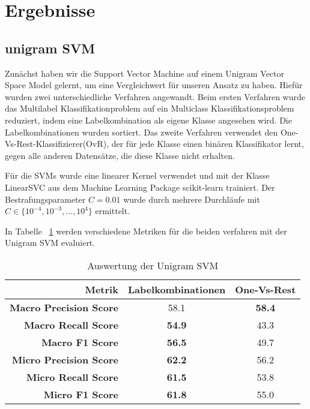 \section{Ergebnisse}
\subsection{unigram SVM}
\label{sub:unigram_svm}

Zunächst haben wir die Support Vector Machine auf einem Unigram Vector Space Model gelernt,
um eine Vergleichwert für unseren Ansatz zu haben. Hiefür wurden zwei unterschiedliche Verfahren angewandt.
Beim ersten Verfahren wurde das Multilabel Klassifikationproblem auf ein Multiclass Klassifikationsproblem reduziert,
indem eine Labelkombination als eigene Klasse angesehen wird. Die Labelkombinationen wurden sortiert.
Das zweite Verfahren verwendet den One-Vs-Rest-Klassifizierer(OvR), der für jede Klasse einen binären Klassifikator lernt,
gegen alle anderen Datensätze, die diese Klasse nicht erhalten.

Für die SVMs wurde eine linearer Kernel verwendet und mit der Klasse LinearSVC aus dem Machine Learning Package scikit-learn \cite{scikit-learn} trainiert. Der Bestrafungsparameter $C = 0.01$ wurde durch mehrere Durchläufe mit $C \in \{ 10^{-4},10^{-3}, \dots, 10^4 \}$ ermittelt.

In Tabelle ~\ref{tab:unigram_svm} werden verschiedene Metriken für die beiden verfahren mit der Unigram SVM evaluiert.

\begin{table}[h]
    \centering
    \begin{tabular}{r|cc}
        \small \textbf{Metrik} & \small\textbf{Labelkombinationen} & \small\textbf{One-Vs-Rest}\\
        \hline
        \small \textbf{Macro Precision Score}  & \small 58.1 & \small  \textbf{58.4}\\
        \small \textbf{Macro Recall Score}     & \small \textbf{54.9} & \small 43.3\\
        \small \textbf{Macro F1 Score}        & \small \textbf{56.5} & \small 49.7\\
        \small \textbf{Micro Precision Score} & \small \textbf{62.2} & \small 56.2\\
        \small \textbf{Micro Recall Score}    & \small \textbf{61.5} & \small 53.8\\
        \small \textbf{Micro F1 Score}        & \small \textbf{61.8} & \small 55.0\\
    \end{tabular}
    \caption{Auswertung der Unigram SVM}
    \label{tab:unigram_svm}
\end{table}

